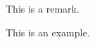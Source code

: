 \documentclass{article}
\begin{document}
\begin{remark}
    This is a remark.
\end{remark}

\begin{example}
    This is an example.
\end{example}

\nocite{*}


\end{document}
